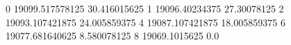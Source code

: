 0 19099.517578125 30.416015625
1 19096.40234375 27.30078125
2 19093.107421875 24.005859375
4 19087.107421875 18.005859375
6 19077.681640625 8.580078125
8 19069.1015625 0.0
